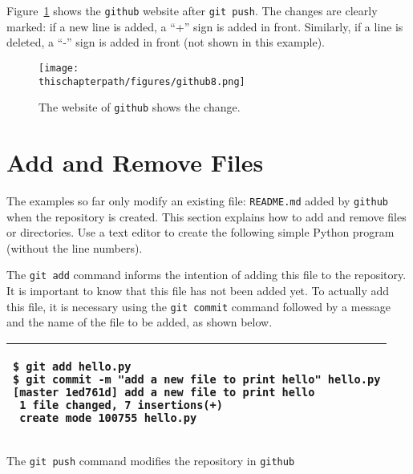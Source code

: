 Figure~\ref{fig:github8} shows the {\tt github} website after {\tt git
  push}.  The changes are clearly marked: if a new line is added, a
``+'' sign is added in front.  Similarly, if a line is deleted, a
``-'' sign is added in front (not shown in this example).

\begin{figure}[h] \centering
{\texttt{[image: \\thischapterpath/figures/github8.png]}}
\caption{The website of {\tt github} shows the change.}
\label{fig:github8}
\end{figure}


\section{Add and Remove Files}

The examples so far only modify an existing file: {\tt README.md}
added by {\tt github} when the repository is created.  This section
explains how to add and remove files or directories.  Use a text
editor to create the following simple Python program (without the line
numbers).

\resetlinenumber[1]
\linenumbers
\begin{tt}
  
\end{tt}
\nolinenumbers


The {\tt git add} command informs the intention of adding this file to
the repository.  It is important to know that this file has not been
added yet.  To actually add this file, it is necessary using
the {\tt git commit} command followed by a message and the name of
the file to be added, as shown below.

\vspace{0.2in}

\noindent
\begin{tabular}{|p{5in}|}\hline
\begin{verbatim}
$ git add hello.py
$ git commit -m "add a new file to print hello" hello.py
[master 1ed761d] add a new file to print hello
 1 file changed, 7 insertions(+)
 create mode 100755 hello.py
\end{verbatim}
\\ \hline
\end{tabular}
\vspace{0.2in}

The {\tt git push} command modifies the repository in {\tt github}

